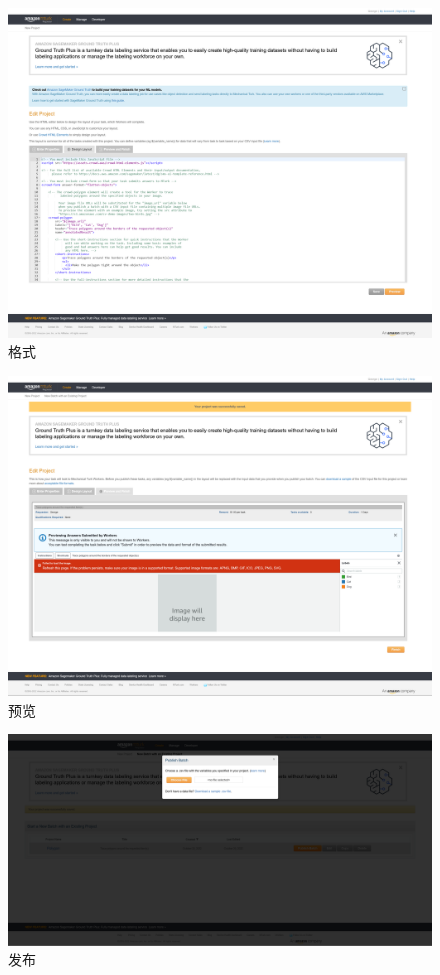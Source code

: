 \begin{figure}[h!]
    \centering
    \includegraphics[width=0.7\linewidth]{imgs/layout.png}
    \caption{格式}
    \label{fig:layout}
\end{figure}

\begin{figure}[h!]
    \centering
    \includegraphics[width=0.7\linewidth]{imgs/preview.png}
    \caption{预览}
    \label{fig:preview}
\end{figure}

\newpage

\begin{figure}[h!]
    \centering
    \includegraphics[width=\linewidth]{imgs/publish.png}
    \caption{发布}
    \label{fig:publish}
\end{figure}